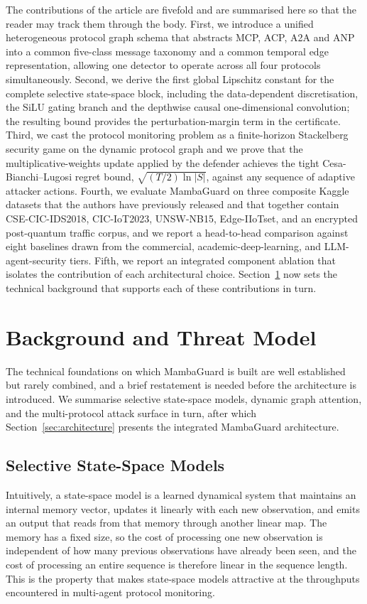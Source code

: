 \documentclass[journal,10pt,twocolumn]{IEEEtran}
\begin{document}
The contributions of the article are fivefold and are summarised here so that the reader may track them through the body. First, we introduce a unified heterogeneous protocol graph schema that abstracts MCP, ACP, A2A and ANP into a common five-class message taxonomy and a common temporal edge representation, allowing one detector to operate across all four protocols simultaneously. Second, we derive the first global Lipschitz constant for the complete selective state-space block, including the data-dependent discretisation, the SiLU gating branch and the depthwise causal one-dimensional convolution; the resulting bound provides the perturbation-margin term in the certificate. Third, we cast the protocol monitoring problem as a finite-horizon Stackelberg security game on the dynamic protocol graph and we prove that the multiplicative-weights update applied by the defender achieves the tight Cesa-Bianchi--Lugosi regret bound, $\sqrt{(T/2)\ln|S|}$, against any sequence of adaptive attacker actions. Fourth, we evaluate MambaGuard on three composite Kaggle datasets that the authors have previously released and that together contain CSE-CIC-IDS2018, CIC-IoT2023, UNSW-NB15, Edge-IIoTset, and an encrypted post-quantum traffic corpus, and we report a head-to-head comparison against eight baselines drawn from the commercial, academic-deep-learning, and LLM-agent-security tiers. Fifth, we report an integrated component ablation that isolates the contribution of each architectural choice. Section~\ref{sec:background} now sets the technical background that supports each of these contributions in turn.

\section{Background and Threat Model}
\label{sec:background}

The technical foundations on which MambaGuard is built are well established but rarely combined, and a brief restatement is needed before the architecture is introduced. We summarise selective state-space models, dynamic graph attention, and the multi-protocol attack surface in turn, after which Section~\ref{sec:architecture} presents the integrated MambaGuard architecture.

\subsection{Selective State-Space Models}
Intuitively, a state-space model is a learned dynamical system that maintains an internal memory vector, updates it linearly with each new observation, and emits an output that reads from that memory through another linear map. The memory has a fixed size, so the cost of processing one new observation is independent of how many previous observations have already been seen, and the cost of processing an entire sequence is therefore linear in the sequence length. This is the property that makes state-space models attractive at the throughputs encountered in multi-agent protocol monitoring.
\end{document}
